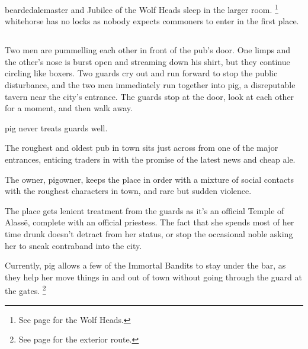 \begin{multicols}{2}
\Gls{beardedalemaster} and Jubilee of the Wolf Heads sleep in the larger room.%
\footnote{See page \pageref{wolfHeads} for the Wolf Heads.}
\Gls{whitehorse} has no locks as nobody expects commoners to enter in the first place.
 

\subsection{}

\setcounter{list}{0}

\begin{boxtext}

  Two men are pummelling each other in front of the pub's door.
   One limps and the other's nose is burst open and streaming down his shirt, but they continue circling like boxers.
   Two guards cry out and run forward to stop the public disturbance, and the two men immediately run together into \gls{pig}, a disreputable tavern near the city's entrance.
   The guards stop at the door, look at each other for a moment, and then walk away.

\Gls{pig} never treats \glspl{guard} well.

\end{boxtext}
 
The roughest and oldest pub in \gls{town} sits just across from one of the major entrances, enticing traders in with the promise of the latest news and cheap ale.

The owner, \gls{pigowner}, keeps the place in order with a mixture of social contacts with the roughest characters in \gls{town}, and rare but sudden violence.

The place gets lenient treatment from the guards as it's an official Temple of Alass\"{e}, complete with an official priestess.
The fact that she spends most of her time drunk doesn't detract from her status, or stop the occasional noble asking her to sneak contraband into the city.

Currently, \gls{pig} allows a few of the Immortal Bandits to stay under the bar, as they help her move things in and out of town without going through the \gls{guard} at the gates.%
\footnote{See page \pageref{farmExit} for the exterior route.}



\begin{boxtext}


\end{boxtext}
\end{multicols}
